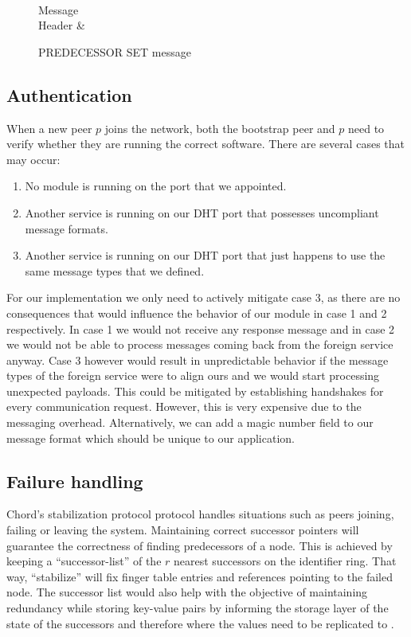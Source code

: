\documentclass[a4paper, 11pt]{article}
\begin{document}
\begin{figure}[H]
	\centering
	\begin{bytefield}[bitwidth=0.8em]{32}
		 \\
		\begin{rightwordgroup}{Message \\  Header}
			 & 
		\end{rightwordgroup}
	\end{bytefield}
	\caption{PREDECESSOR SET message}
	\label{PREDECESSORSET}
\end{figure}

\subsection{Authentication}

When a new peer $p$ joins the network, both the bootstrap peer and $p$ need to verify whether they are running the correct software. There are several cases that may occur:

\begin{enumerate}
	\item No module is running on the port that we appointed.
	\item Another service is running on our DHT port that possesses uncompliant message formats. 
	\item Another service is running on our DHT port that just happens to use the same message types that we defined.
\end{enumerate}

For our implementation we only need to actively mitigate case 3, as there are no consequences that would influence the behavior of our module in case 1 and 2 respectively. In case 1 we would not receive any response message and in case 2 we would not be able to process messages coming back from the foreign service anyway. Case 3 however would result in unpredictable behavior if the message types of the foreign service were to align ours and we would start processing unexpected payloads. This could be mitigated by establishing handshakes for every communication request. However, this is very expensive due to the messaging overhead. Alternatively, we can add a magic number field to our message format which should be unique to our application.

\subsection{Failure handling}
Chord's stabilization protocol protocol handles situations such as peers joining, failing or leaving the system. Maintaining correct successor pointers will guarantee the correctness of finding predecessors of a node. This is achieved by keeping a ``successor-list'' of the $r$ nearest successors on the identifier ring. That way, ``stabilize'' will fix finger table entries and references pointing to the failed node. The successor list would also help with the objective of maintaining redundancy while storing key-value pairs by informing the storage layer of the state of the successors and therefore where the values need to be replicated to \cite{Chord}. 
\end{document}
